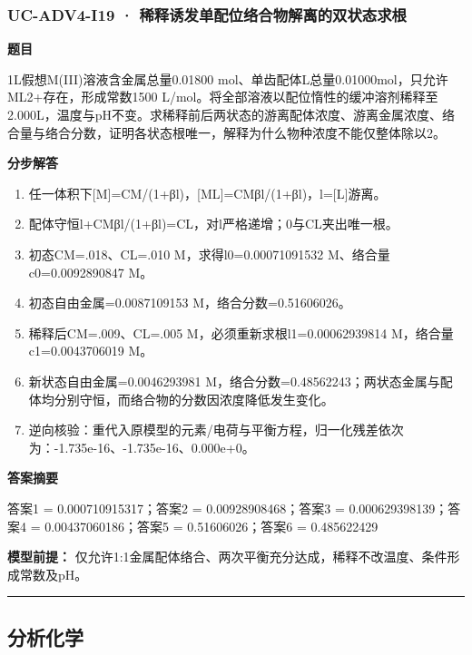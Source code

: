 \documentclass[UTF8,11pt,a4paper]{ctexart}
\begin{document}
\subsubsection*{UC-ADV4-I19 · 稀释诱发单配位络合物解离的双状态求根}
\noindent\textbf{题目}\par
1L假想M(III)溶液含金属总量0.01800 mol、单齿配体L总量0.01000mol，只允许ML2+存在，形成常数1500 L/mol。将全部溶液以配位惰性的缓冲溶剂稀释至2.000L，温度与pH不变。求稀释前后两状态的游离配体浓度、游离金属浓度、络合量与络合分数，证明各状态根唯一，解释为什么物种浓度不能仅整体除以2。\par
\medskip\noindent\textbf{分步解答}
\begin{enumerate}
\item 任一体积下[M]=CM/(1+βl)，[ML]=CMβl/(1+βl)，l=[L]游离。
\item 配体守恒l+CMβl/(1+βl)=CL，对l严格递增；0与CL夹出唯一根。
\item 初态CM=.018、CL=.010 M，求得l0=0.00071091532 M、络合量c0=0.0092890847 M。
\item 初态自由金属=0.0087109153 M，络合分数=0.51606026。
\item 稀释后CM=.009、CL=.005 M，必须重新求根l1=0.00062939814 M，络合量c1=0.0043706019 M。
\item 新状态自由金属=0.0046293981 M，络合分数=0.48562243；两状态金属与配体均分别守恒，而络合物的分数因浓度降低发生变化。
\item 逆向核验：重代入原模型的元素/电荷与平衡方程，归一化残差依次为：-1.735e-16、-1.735e-16、0.000e+0。
\end{enumerate}
\noindent\textbf{答案摘要}\par
答案1 = 0.000710915317；答案2 = 0.00928908468；答案3 = 0.000629398139；答案4 = 0.00437060186；答案5 = 0.51606026；答案6 = 0.485622429\par
\noindent\textbf{模型前提：}
仅允许1:1金属配体络合、两次平衡充分达成，稀释不改温度、条件形成常数及pH。\par
\medskip\hrule\medskip
\subsection*{分析化学}
\end{document}
